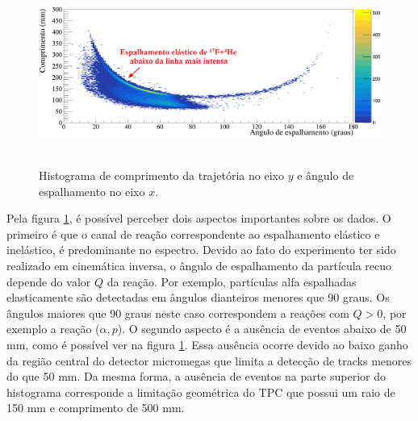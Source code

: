 \documentclass[a4paper,12pt,oneside]{book}
\begin{document}
\begin{figure}[H]
    \centering
    \includegraphics[scale = 0.5, width=\columnwidth]{figs/comp_vs_ang_n2_2.png}\
    \caption{Histograma de comprimento da trajetória no eixo $y$ e ângulo de espalhamento no eixo $x$.}
    \label{fig:comp_vs_ang}
\end{figure}

\par Pela figura \ref{fig:comp_vs_ang}, é possível perceber dois aspectos importantes sobre os dados. O primeiro é que o canal de reação correspondente ao espalhamento elástico e inelástico, é predominante no espectro. Devido ao fato do experimento ter sido realizado em cinemática inversa, o ângulo de espalhamento da partícula recuo depende do valor $Q$ da reação. Por exemplo, partículas alfa espalhadas elasticamente são detectadas em ângulos dianteiros menores que 90 graus. Os ângulos maiores que 90 graus neste caso correspondem a reações com $Q>0$, por exemplo a reação ($\alpha, p$). O segundo aspecto é a ausência de eventos abaixo de 50 mm, como é possível ver na figura \ref{fig:comp_vs_ang}. Essa ausência ocorre devido ao baixo ganho da região central do detector micromegas que limita a detecção de tracks menores do que 50 mm. Da mesma forma, a ausência de eventos na parte superior do histograma corresponde a limitação geométrica do TPC que possui um raio de 150 mm e comprimento de 500 mm.

\end{document}
